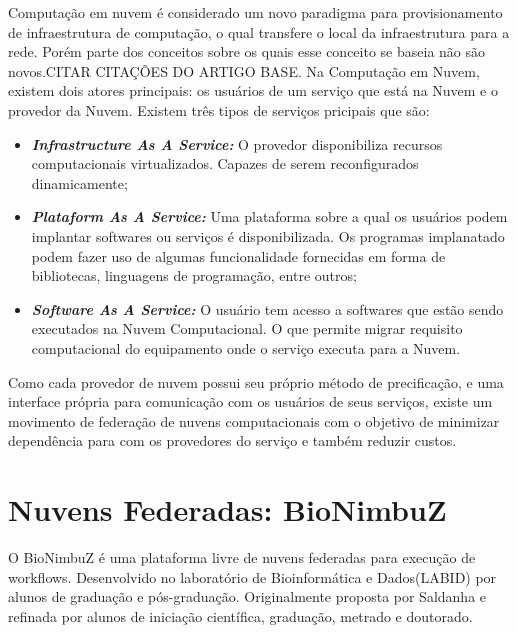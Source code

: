 Computação em nuvem é considerado um novo paradigma para provisionamento de infraestrutura de computação, o qual transfere o local da infraestrutura para a rede. Porém parte dos conceitos sobre os quais esse conceito se baseia não são novos.\cite{Vaquero:2008:BCT:1496091.1496100_Cloud_definition}CITAR CITAÇÕES DO ARTIGO BASE.
Na Computação em Nuvem, existem dois atores principais: os usuários de um serviço que está na Nuvem e o provedor da Nuvem. Existem três tipos de serviços pricipais que são\cite{NIST_CLOUD_DEFINITION}:

\begin{itemize}
	\item \textbf{\textit{Infrastructure As A Service:}} O provedor disponibiliza recursos computacionais virtualizados. Capazes de serem reconfigurados dinamicamente;
	\item \textbf{\textit{Plataform As A Service:}} Uma plataforma sobre a qual os usuários podem implantar softwares ou serviços é disponibilizada. Os programas implanatado podem fazer uso de algumas funcionalidade fornecidas em forma de bibliotecas, linguagens de programação, entre outros;
	\item \textbf{\textit{Software As A Service:}} O usuário tem acesso a softwares que estão sendo executados na Nuvem Computacional. O que permite migrar requisito computacional do equipamento onde o serviço executa para a Nuvem.
\end{itemize}

Como cada provedor de nuvem possui seu próprio método de precificação, e uma interface própria para comunicação com os usuários de seus serviços, existe um movimento de federação de nuvens computacionais com o objetivo de minimizar dependência para com os provedores do serviço e também reduzir custos.

\section{Nuvens Federadas: BioNimbuZ}

O BioNimbuZ é uma plataforma livre de nuvens federadas para execução de workflows. Desenvolvido no laboratório de Bioinformática e Dados(LABID) por alunos de graduação e pós-graduação. Originalmente proposta por Saldanha\cite{Saldanha_BioNimbus} e refinada por alunos de iniciação científica, graduação, metrado e doutorado.\cite{closer12_BioNimbuZ_AHP}\cite{BioNimbuZ_6846526} \cite{6732620_BioNimbuZ_ACOsched}\cite{BioNimbuZ_Breno_Deric}\cite{BioNimbuZ_Vegara}\cite{BioNimbuZ_Willian_C99}

